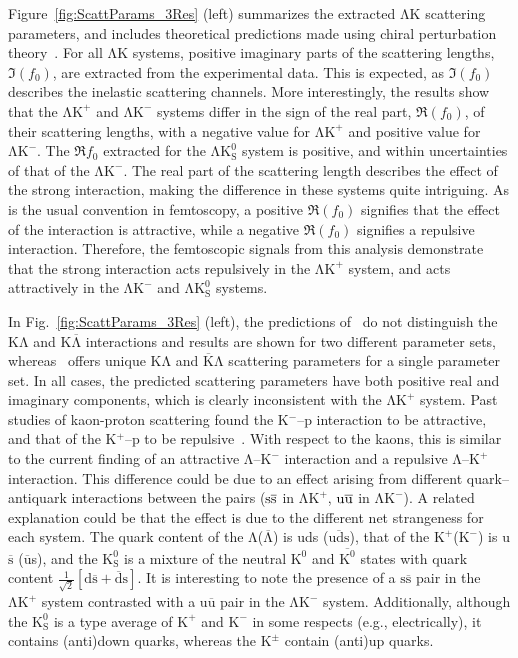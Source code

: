 \documentclass{svproc}
\newcommand{\Lam}{$\mathrm{\Lambda}$\xspace}
\newcommand{\ALam}{$\overline{\mathrm{\Lambda}}$\xspace}
\newcommand{\KchP}{$\mathrm{K^{+}}$\xspace}
\newcommand{\KchM}{$\mathrm{K^{-}}$\xspace}
\newcommand{\Kpm}{$\mathrm{K^{\pm}}$\xspace}
\newcommand{\Ks}{$\mathrm{K^{0}_{S}}$\xspace}
\newcommand{\LamK}{$\mathrm{\Lambda}\mathrm{K}$\xspace}
\newcommand{\LamKchP}{$\mathrm{\Lambda}\mathrm{K^{+}}$\xspace}
\newcommand{\LamKchM}{$\mathrm{\Lambda}\mathrm{K^{-}}$\xspace}
\newcommand{\LamKs}{$\mathrm{\Lambda}\mathrm{K^{0}_{S}}$\xspace}
\begin{document}
Figure~\ref{fig:ScattParams_3Res} (left) summarizes the extracted \LamK scattering parameters, and includes theoretical predictions made using chiral perturbation theory~\cite{Liu:2006xja,Mai:2009ce}.
For all \LamK systems, positive imaginary parts of the scattering lengths, $\Im(f_{0})$, are extracted from the experimental data. 
This is expected, as $\Im(f_{0})$ describes the inelastic scattering channels.
More interestingly, the results show that the \LamKchP and \LamKchM systems differ in the sign of the real part, $\Re(f_{0})$, of their scattering lengths, with a negative value for \LamKchP and positive value for \LamKchM.
The $\Re f_{0}$ extracted for the \LamKs system is positive, and within uncertainties of that of the \LamKchM. 
The real part of the scattering length describes the effect of the strong interaction, making the difference in these systems quite intriguing.
As is the usual convention in femtoscopy, a positive $\Re(f_{0})$ signifies that the effect of the interaction is attractive, while a negative $\Re(f_{0})$ signifies a repulsive interaction.
Therefore, the femtoscopic signals from this analysis demonstrate that the strong interaction acts repulsively in the \LamKchP system, and acts attractively in the \LamKchM and \LamKs systems.

In Fig.~\ref{fig:ScattParams_3Res} (left), the predictions of~\cite{Liu:2006xja} do not distinguish the K\Lam and K\ALam interactions and results are shown for two different parameter sets, whereas~\cite{Mai:2009ce} offers unique K\Lam and $\overline{\mathrm{K}}$\Lam scattering parameters for a single parameter set. 
In all cases, the predicted scattering parameters have both positive real and imaginary components, which is clearly inconsistent with the \LamKchP system.
Past studies of kaon-proton scattering found the K$^{-}$--p interaction to be attractive, and that of the K$^{+}$--p to be repulsive~\cite{Humphrey:1962zz,Hadjimichef:2002xe,Ikeda:2012au}.
With respect to the kaons, this is similar to the current finding of an attractive \Lam--\KchM interaction and a repulsive \Lam--\KchP interaction.
This difference could be due to an effect arising from different quark--antiquark interactions between the pairs ($\rm s\overline{s}$ in \LamKchP, $\rm u\overline{u}$ in \LamKchM).
A related explanation could be that the effect is due to the different net strangeness for each system.
The quark content of the \Lam (\ALam) is uds ($\overline{\mathrm{uds}}$), that of the \KchP (\KchM) is u$\overline{\mathrm{s}}$ ($\overline{\mathrm{u}}$s), and the \Ks is a mixture of the neutral $\mathrm{K}^{0}$ and $\overline{\mathrm{K}^{0}}$ states with quark content $\frac{1}{\sqrt{2}}\left[\mathrm{d\overline{s} + \overline{d}s}\right]$.
It is interesting to note the presence of a $\mathrm{s\overline{s}}$ pair in the \LamKchP system contrasted with a $\mathrm{u\overline{u}}$ pair in the \LamKchM system.
Additionally, although the \Ks is a type average of \KchP and \KchM in some respects (e.g., electrically), it contains (anti)down quarks, whereas the \Kpm contain (anti)up quarks.
\end{document}
